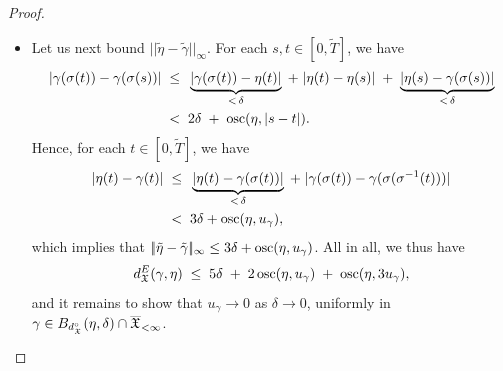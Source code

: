 \documentclass[a4paper, 11pt]{article}
\theoremstyle{definition}
\numberwithin{equation}{section}
\numberwithin{figure}{section}
\newcommand{\Xpaths}[1][]{\mathfrak{X}_{#1}}
\newcommand{\Xfinpathscl}{\overline{\Xpaths}_{<\infty}}
\newcommand{\Bmetric}[3][]{B_{#1}(#2,#3)}%
\newcommand{\norm}[1]{|\!|#1|\!|}
\newcommand{\normUniform}[1]{\norm{#1}_\infty}
\newcommand{\dXpathsEucl}{d_{\Xpaths[]}^E}
\newcommand{\dXpathsUnparam}{d_{\Xpaths}^\circ}%
\begin{document}
\begin{proof}
\begin{itemize}[leftmargin=*]
\item 
Let us next bound $\normUniform{\tilde\eta - \tilde{\gamma}}$. For each $s, t \in [0,\tilde{T}]$, we have
\begin{align*}
|\gamma(\sigma(t)) - \gamma(\sigma(s))| 
\; \le \;\; & 
\underbrace{|\gamma(\sigma(t))-\eta(t)|}_{< \, \delta}  
\; + \; |\eta(t)-\eta(s)| 
\; + \; \underbrace{|\eta(s)-\gamma(\sigma(s))|}_{< \, \delta}  
\\
\; < \;\; & 2\delta \; + \; \textnormal{osc}(\eta, |s-t|) .
\end{align*}
Hence, for each $t \in [0,\tilde{T}]$, we have
\begin{align*}
|\eta(t)-\gamma(t)| 
\; \le \;\; & 
\underbrace{|\eta(t)-\gamma(\sigma(t))|}_{< \, \delta}  
\; + \; |\gamma(\sigma(t)) - \gamma(\sigma(\sigma^{-1}(t)))| 
\\
\; < \;\; & 3\delta + \textnormal{osc}(\eta, u_\gamma),
\end{align*}
which implies that $\normUniform{\tilde\eta-\tilde{\gamma}} \le 3\delta + \osc(\eta, u_\gamma)$. 
All in all, we thus have
\begin{align*}
\dXpathsEucl(\gamma, \eta) \; \le \; 5\delta \; + \; 2\,\osc(\eta, u_\gamma) \; + \; \osc(\eta, 3u_\gamma) ,
\end{align*}
and it remains to show that 
$u_\gamma \to 0$ as $\delta \to 0$, uniformly in $\gamma \in \smash{\Bmetric[\dXpathsUnparam]{\eta}{\delta} \cap \Xfinpathscl}$. 
\end{itemize}


\end{proof}
\end{document}

